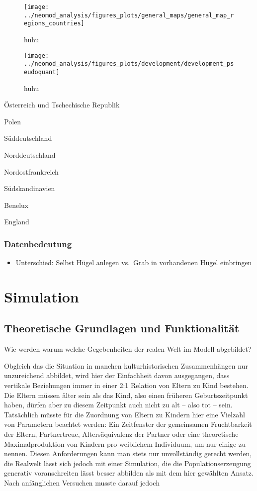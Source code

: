 \documentclass[openany,twoside,twocolumn]{book}
\providecommand{\tightlist}{%
  \setlength{\itemsep}{0pt}\setlength{\parskip}{0pt}}
\begin{document}
\begin{figure}
\texttt{[image: ../neomod\_analysis/figures\_plots/general\_maps/general\_map\_regions\_countries]} \caption[huhu]{huhu}\label{fig:general-map-regions-countries}
\end{figure}

\begin{figure}
\texttt{[image: ../neomod\_analysis/figures\_plots/development/development\_pseudoquant]} \caption[huhu]{huhu}\label{fig:development-proportions-regions-pseudoquant}
\end{figure}

Österreich und Tschechische Republik

Polen

Süddeutschland

Norddeutschland

Nordostfrankreich

Südskandinavien

Benelux

England

\hypertarget{datenbedeutung}{%
\subsubsection{Datenbedeutung}\label{datenbedeutung}}

\begin{itemize}
\tightlist
\item
  Unterschied: Selbst Hügel anlegen vs.~Grab in vorhandenen Hügel
  einbringen
\end{itemize}

\hypertarget{simulation}{%
\section{Simulation}\label{simulation}}

\hypertarget{simulation-theorie}{%
\subsection{Theoretische Grundlagen und
Funktionalität}\label{simulation-theorie}}

Wie werden warum welche Gegebenheiten der realen Welt im Modell
abgebildet?

Obgleich das die Situation in manchen kulturhistorischen Zusammenhängen
nur unzureichend abbildet, wird hier der Einfachheit davon ausgegangen,
dass vertikale Beziehungen immer in einer 2:1 Relation von Eltern zu
Kind bestehen. Die Eltern müssen älter sein als das Kind, also einen
früheren Geburtszeitpunkt haben, dürfen aber zu diesem Zeitpunkt auch
nicht zu alt -- also tot -- sein. Tatsächlich müsste für die Zuordnung
von Eltern zu Kindern hier eine Vielzahl von Parametern beachtet werden:
Ein Zeitfenster der gemeinsamen Fruchtbarkeit der Eltern, Partnertreue,
Altersäquivalenz der Partner oder eine theoretische Maximalproduktion
von Kindern pro weiblichem Individuum, um nur einige zu nennen. Diesen
Anforderungen kann man stets nur unvollständig gerecht werden, die
Realwelt lässt sich jedoch mit einer Simulation, die die
Populationserzeugung generativ voranschreiten lässt besser abbilden als
mit dem hier gewählten Ansatz. Nach anfänglichen Versuchen musste darauf
jedoch
\end{document}
